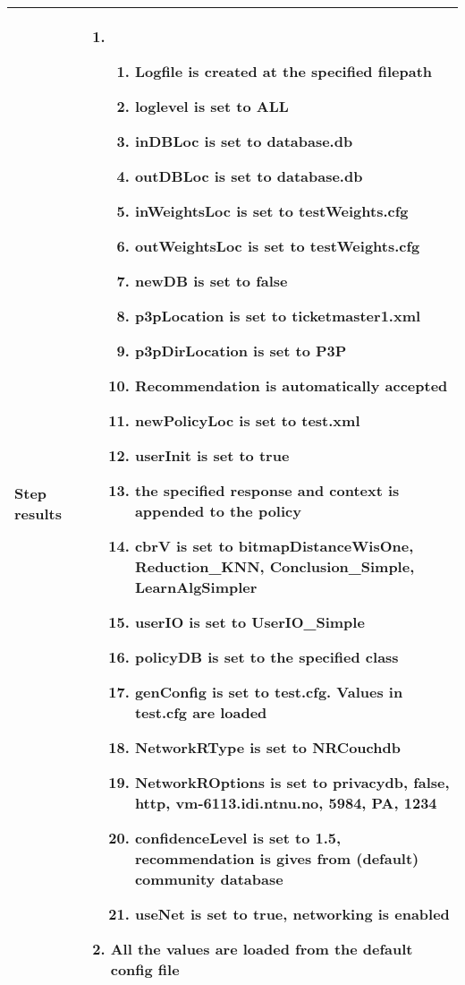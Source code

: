 \begin{center}
\begin{longtable}{ | p{4cm} | p{10cm} | }
			Step results & 	\begin{enumerate}
							\item
							\begin{enumerate}
								\item Logfile is created at the specified filepath
								\item loglevel is set to ALL
								\item inDBLoc is set to database.db
								\item outDBLoc is set to database.db
								\item inWeightsLoc is set to testWeights.cfg
								\item outWeightsLoc is set to testWeights.cfg
								\item newDB is set to false
								\item p3pLocation is set to ticketmaster1.xml
								\item p3pDirLocation is set to P3P
								\item Recommendation is automatically accepted
								\item newPolicyLoc is set to test.xml
								\item userInit is set to true
								\item the specified response and context is appended to the policy
								\item cbrV is set to bitmapDistanceWisOne, Reduction\_KNN, Conclusion\_Simple, LearnAlgSimpler
								\item userIO is set to UserIO\_Simple
								\item policyDB is set to the specified class
								\item genConfig is set to test.cfg. Values in test.cfg are loaded
								\item NetworkRType is set to NRCouchdb
								\item NetworkROptions is set to privacydb, false, http, vm-6113.idi.ntnu.no, 5984, PA, 1234
								\item confidenceLevel is set to 1.5, recommendation is gives from (default) community database
								\item useNet is set to true, networking is enabled
							\end{enumerate}
							\item All the values are loaded from the default config file
						\end{enumerate} \\ [3pt] \hline


\end{longtable}
\end{center}
